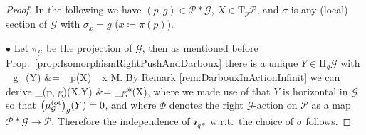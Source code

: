 \documentclass[a4paper,oneside,11pt,bibliography=totoc]{scrartcl}
\def\bas#1\eas{\begin{align*}#1\end{align*}}
\theoremstyle{plain}
\theoremstyle{remark}
\theoremstyle{definition}
\begin{document}
\begin{proof}
\leavevmode\newline
In the following we have $(p, g) \in \mathcal{P} * \mathcal{G}$, $X \in \mathrm{T}_p \mathcal{P}$, and $\sigma$ is any (local) section of $\mathcal{G}$ with $\sigma_x = g$ ($x \coloneqq \pi(p)$).

$\bullet$ Let $\pi_{\mathcal{G}}$ be the projection of $\mathcal{G}$, then as mentioned before Prop.\ \ref{prop:IsomorphismRightPushAndDarboux} there is a unique $Y \in \mathrm{H}_g\mathcal{G}$ with
\bas
\mathrm{D}_g\pi_{}(Y)
&=
_p\pi(X)
\in
{}_x M.
\eas
By Remark \ref{rem:DarbouxInActionInfinit} we can derive
\bas
\mathrm{D}_{(p, g)}\Phi(X,Y)
&=
_{g*}(X),
\eas
where we made use of that $Y$ is horizontal in $\mathcal{G}$ so that $\mleft(\mu_{\mathcal{G}}^{\mathrm{tot}}\mright)_g(Y) = 0$, and where $\Phi$ denotes the right $\mathcal{G}$-action on $\mathcal{P}$ as a map $\mathcal{P}*\mathcal{G} \to \mathcal{P}$. Therefore the independence of $\mathcal{r}_{g*}$ w.r.t.\ the choice of $\sigma$ follows.


\end{proof}
\end{document}
